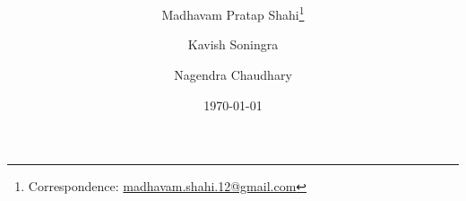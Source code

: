 \documentclass[11pt]{article}
\title{\bfseries \papertitle}
\author[1]{Madhavam Pratap Shahi\thanks{Correspondence:
\href{mailto:madhavam.shahi.12@gmail.com}{madhavam.shahi.12@gmail.com}}}
\author[1]{Kavish Soningra}
\author[1]{Nagendra Chaudhary}
\affil[1]{Independent Researcher}
\date{\today}
\begin{document}
\maketitle

\begin{abstract}
\noindent

\end{abstract}












\appendix

\end{document}
